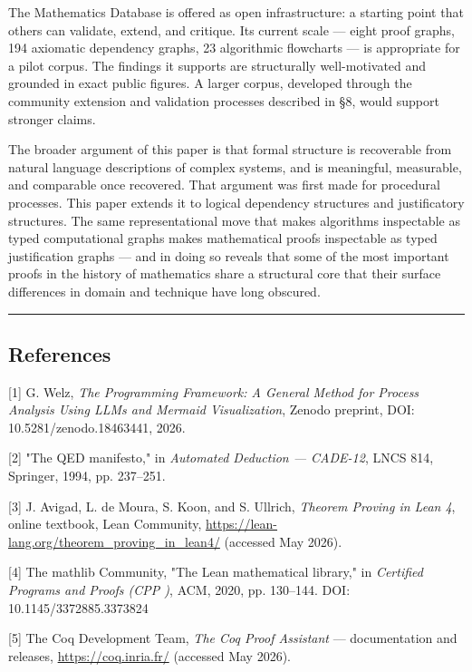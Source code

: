 \documentclass[
  11pt]{article}
\begin{document}
The Mathematics Database is offered as open infrastructure: a starting
point that others can validate, extend, and critique. Its current scale
--- eight proof graphs, 194 axiomatic dependency graphs, 23 algorithmic
flowcharts --- is appropriate for a pilot corpus. The findings it
supports are structurally well-motivated and grounded in exact public
figures. A larger corpus, developed through the community extension and
validation processes described in §8, would support stronger claims.

The broader argument of this paper is that formal structure is
recoverable from natural language descriptions of complex systems, and
is meaningful, measurable, and comparable once recovered. That argument
was first made for procedural processes. This paper extends it to
logical dependency structures and justificatory structures. The same
representational move that makes algorithms inspectable as typed
computational graphs makes mathematical proofs inspectable as typed
justification graphs --- and in doing so reveals that some of the most
important proofs in the history of mathematics share a structural core
that their surface differences in domain and technique have long
obscured.

\begin{center}\rule{0.5\linewidth}{0.5pt}\end{center}

\hypertarget{references}{%
\subsection{References}\label{references}}

{[}1{]} G. Welz, \emph{The Programming Framework: A General Method for
Process Analysis Using LLMs and Mermaid Visualization}, Zenodo preprint,
DOI: 10.5281/zenodo.18463441, 2026.

{[}2{]} "The QED manifesto," in \emph{Automated Deduction --- CADE-12},
LNCS 814, Springer, 1994, pp. 237--251.

{[}3{]} J. Avigad, L. de Moura, S. Koon, and S. Ullrich, \emph{Theorem
Proving in Lean 4}, online textbook, Lean Community,
\url{https://lean-lang.org/theorem_proving_in_lean4/} (accessed May
2026).

{[}4{]} The mathlib Community, "The Lean mathematical library," in
\emph{Certified Programs and Proofs (CPP )}, ACM,
2020, pp. 130--144. DOI: 10.1145/3372885.3373824

{[}5{]} The Coq Development Team, \emph{The Coq Proof Assistant} ---
documentation and releases, \url{https://coq.inria.fr/} (accessed May
2026).
\end{document}
